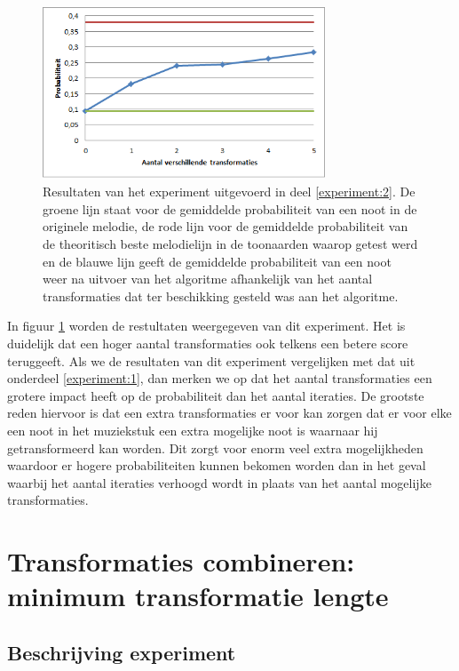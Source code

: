 \begin{figure}[!ht]
  \centering
  \includegraphics[width=0.75\textwidth]{5_Experimenten_Resultaten/exp2_res}
  \caption{Resultaten van het experiment uitgevoerd in deel \ref{experiment:2}. De groene lijn staat voor de gemiddelde probabiliteit van een noot in de originele melodie, de rode lijn voor de gemiddelde probabiliteit van de theoritisch beste melodielijn in de toonaarden waarop getest werd en de blauwe lijn geeft de gemiddelde probabiliteit van een noot weer na uitvoer van het algoritme afhankelijk van het aantal transformaties dat ter beschikking gesteld was aan het algoritme.}
  \label{figuur:exp2}
\end{figure}

In figuur \ref{figuur:exp2} worden de restultaten weergegeven van dit experiment. Het is duidelijk dat een  hoger aantal transformaties ook telkens een betere score teruggeeft. Als we de resultaten van dit experiment vergelijken met dat uit onderdeel \ref{experiment:1}, dan merken we op dat het aantal transformaties een grotere impact heeft op de probabiliteit dan het aantal iteraties. De grootste reden hiervoor is dat een extra transformaties er voor kan zorgen dat er voor elke een noot in het muziekstuk een extra mogelijke noot is waarnaar hij getransformeerd kan worden. Dit zorgt voor enorm veel extra mogelijkheden waardoor er hogere probabiliteiten kunnen bekomen worden dan in het geval waarbij het aantal iteraties verhoogd wordt in plaats van het aantal mogelijke transformaties.  


\section{Transformaties combineren: minimum transformatie lengte}
\label{experiment:3}
\subsection{Beschrijving experiment}

